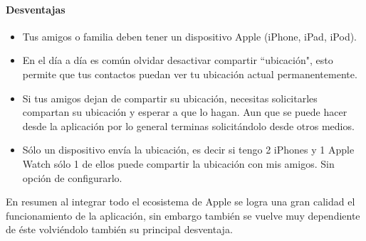 \paragraph{Desventajas}

\begin{itemize}
\item Tus amigos o familia deben tener un dispositivo Apple (iPhone, iPad, iPod).
\item En el día a día es común olvidar desactivar compartir ``ubicación", esto permite que tus contactos puedan ver tu ubicación actual permanentemente.
\item Si tus amigos dejan de compartir su ubicación, necesitas solicitarles compartan su ubicación y esperar a que lo hagan. Aun que se puede hacer desde la aplicación por lo general terminas solicitándolo desde otros medios.
\item Sólo un dispositivo envía la ubicación, es decir si tengo 2 iPhones y 1 Apple Watch sólo 1 de ellos puede compartir la ubicación con mis amigos. Sin opción de configurarlo.
\end{itemize}

En resumen al integrar todo el ecosistema de Apple se logra una gran calidad el funcionamiento de la aplicación, sin embargo también se vuelve muy dependiente de éste volviéndolo también su principal desventaja.